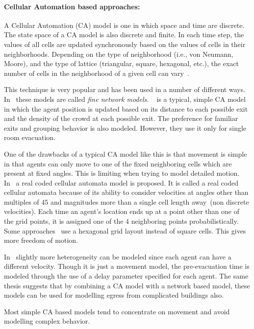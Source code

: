 \paragraph{Cellular Automation based approaches:}

 A Cellular Automation (CA) model is one in which space and time are discrete. The state space of a CA model is also discrete and finite. In each time step, the values of all cells are updated synchronously based on the values of cells in their neighborhoods. Depending on the type of neighborhood (i.e., von Neumann, Moore), and the type of lattice (triangular, square, hexagonal, etc.), the exact number of cells in the neighborhood of a given cell can vary~\cite{Hoekstra:2010}.

 This technique is very popular and has been used in a number of different ways. In~\cite{Gwynne:1999vi,Kuligowski:2005tt} these models are called \emph{fine network models}.
~\cite{Yuan:2007ja} is a typical, simple CA model in which the agent position is updated based on its distance to each possible exit and the density of the crowd at each possible exit. The preference for familiar exits and grouping behavior is also modeled. However, they use it only for single room evacuation.

One of the drawbacks of a typical CA model like this is that movement is simple in that agents can only move to one of the fixed neighboring cells which are present at fixed angles. This is limiting when trying to model detailed motion. In~\cite{Yamamoto:2007dc} a real coded cellular automata model is proposed. It is called a real coded cellular automata because of its ability to consider velocities at angles other than multiples of 45 and magnitudes more than a single cell length away~(non discrete velocities). Each time an agent's location ends up at a point other than one of the grid points, it is assigned one of the 4 neighboring points probabilistically. Some approaches~\cite{Klein:2009} use a hexagonal grid layout instead of square cells. This gives more freedom of motion.

In~\cite{Klupfel:2003waa} slightly more heterogeneity can be modeled since each agent can have a different velocity. Though it is just a movement model, the pre-evacuation time is modeled through the use of a delay parameter specified for each agent. The same thesis suggests that by combining a CA model with a network based model, these models can be used for modelling egress from complicated buildings also.

Most simple CA based models tend to concentrate on movement and avoid modelling complex behavior.


